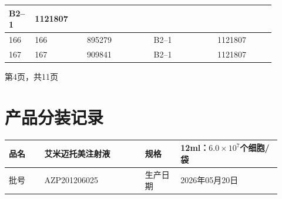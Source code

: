 \documentclass[UTF8,10pt,a4paper,fontset=fandol]{ctexart}
\newcommand{\fieldvalue}[1]{#1}
\begin{document}
\begin{center}
\begin{tabular}{|p{0.07\linewidth}|p{0.18\linewidth}|p{0.23\linewidth}|p{0.22\linewidth}|p{0.20\linewidth}|}
\fieldvalue{B2--1} &
\fieldvalue{1121807} & \\
\hline
166 &
\fieldvalue{166} &
\fieldvalue{895279} &
\fieldvalue{B2--1} &
\fieldvalue{1121807} & \\
\hline
167 &
\fieldvalue{167} &
\fieldvalue{909841} &
\fieldvalue{B2--1} &
\fieldvalue{1121807} & \\
\hline
\end{tabular}

\vspace{0.5em}
第4页，共11页
\end{center}


\newpage

\section*{产品分装记录}

\begin{tabular}{|p{0.12\linewidth}|p{0.34\linewidth}|p{0.12\linewidth}|p{0.34\linewidth}|}
\hline
品名 &
\fieldvalue{艾米迈托美注射液} &
规格 &
\fieldvalue{12ml：$6.0\times10^{7}$个细胞/袋}
\\
\hline
批号 &
\fieldvalue{AZP201206025} &
生产日期 &
\fieldvalue{2026年05月20日}
\\
\hline
\end{tabular}

\vspace{2mm}
\end{document}
